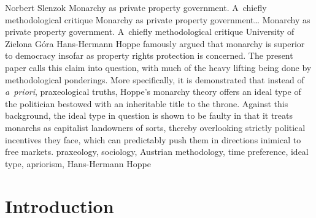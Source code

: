 \begin{artengenv}{Norbert Slenzok}
	{Monarchy as private property government. A~chiefly methodological critique}
	{Monarchy as private property government\ldots}
	{Monarchy as private property government. A~chiefly methodological critique}
	{University of Zielona Góra\label{slenzok-first}}
	{Hans-Hermann Hoppe famously argued that monarchy is superior to democracy insofar as property rights protection is concerned. The present paper calls this claim into question, with much of the heavy lifting being done by methodological ponderings. More specifically, it is demonstrated that instead of \textit{a~priori}, praxeological truths, Hoppe's monarchy theory offers an ideal type of the politician bestowed with an inheritable title to the throne. Against this background, the ideal type in question is shown to be faulty in that it treats monarchs as capitalist landowners of sorts, thereby overlooking strictly political incentives they face, which can predictably push them in directions inimical to free markets.
	}
	{praxeology, sociology, Austrian methodology, time preference, ideal type, apriorism, Hans-Hermann Hoppe}








\section{Introduction}


\end{artengenv}
